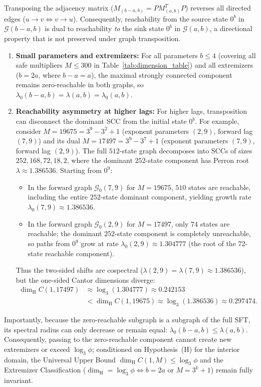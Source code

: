 \documentclass[11pt,reqno]{amsart}
\theoremstyle{plain}
\theoremstyle{definition}
\theoremstyle{remark}
\newcommand{\dimH}{\dim_{\mathrm{H}}}
\begin{document}
Transposing the adjacency matrix ($M_{(b-a, b)} = P M_{(a, b)}^T P$) reverses all directed edges ($u \to v \iff v \to u$). Consequently, reachability from the source state $0^b$ in $\mathcal{G}(b-a, b)$ is dual to reachability \emph{to} the sink state $0^b$ in $\mathcal{G}(a, b)$, a directional property that is not preserved under graph transposition.
\begin{enumerate}
    \item \textbf{Small parameters and extremizers:} For all parameters $b \le 4$ (covering all safe multipliers $M \le 300$ in Table~\ref{tab:dimension_table}) and all extremizers ($b = 2a$, where $b-a = a$), the maximal strongly connected component remains zero-reachable in both graphs, so $\lambda_0(b-a, b) = \lambda(a, b) = \lambda_0(a, b)$.
    \item \textbf{Reachability asymmetry at higher lags:} For higher lags, transposition can disconnect the dominant SCC from the initial state $0^b$. For example, consider $M = 19675 = 3^9 - 3^2 + 1$ (exponent parameters $(2, 9)$, forward lag $(7, 9)$) and its dual $M = 17497 = 3^9 - 3^7 + 1$ (exponent parameters $(7, 9)$, forward lag $(2, 9)$). The full $512$-state graph decomposes into SCCs of sizes $252, 168, 72, 18, 2$, where the dominant $252$-state component has Perron root $\lambda \approx 1.386536$.
    Starting from $0^9$:
    \begin{itemize}
        \item In the forward graph $\mathcal{G}_0(7, 9)$ for $M = 19675$, $510$ states are reachable, including the entire $252$-state dominant component, yielding growth rate $\lambda_0(7, 9) \approx 1.386536$.
        \item In the forward graph $\mathcal{G}_0(2, 9)$ for $M = 17497$, only $74$ states are reachable; the dominant $252$-state component is completely unreachable, so paths from $0^9$ grow at rate $\lambda_0(2, 9) \approx 1.304777$ (the root of the $72$-state reachable component).
    \end{itemize}
    Thus the two-sided shifts are cospectral ($\lambda(2, 9) = \lambda(7, 9) \approx 1.386536$), but the one-sided Cantor dimensions diverge:
    \begin{align}
    \dimH C(1, 17497) &\approx \log_3(1.304777) \approx 0.242153 \nonumber \\
    &< \dimH C(1, 19675) \approx \log_3(1.386536) \approx 0.297474.
    \end{align}
\end{enumerate}
Importantly, because the zero-reachable subgraph is a subgraph of the full SFT, its spectral radius can only decrease or remain equal: $\lambda_0(b-a, b) \le \lambda(a, b)$. Consequently, passing to the zero-reachable component cannot create new extremizers or exceed $\log_3 \phi$; conditioned on Hypothesis~(H) for the interior domain, the Universal Upper Bound $\dimH C(1, M) \le \log_3 \phi$ and the Extremizer Classification ($\dimH = \log_3 \phi \iff b = 2a$ or $M = 3^k+1$) remain fully invariant.
\end{document}
